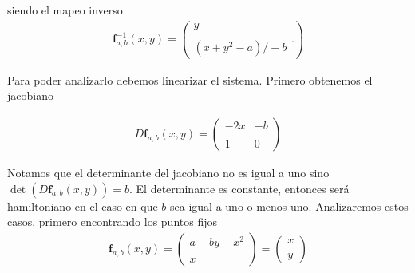 siendo el mapeo inverso
\begin{eqnarray}
\mathbf{f}^{-1}_{a,b}(x,y)=\left( \begin{array}{lcc}
             y\\
             \\ (x+y^{2}-a)/-b
             \end{array}.
             \right) \label{HenonI}
\end{eqnarray} 

       
Para poder analizarlo debemos linearizar el sistema. Primero obtenemos el jacobiano 
            
\begin{eqnarray}
D\mathbf{f}_{a,b}(x,y)= \left( \begin{array}{lcc}
                -2x & -b\\
                \\ 1 & 0
                \end{array}
                \right)
\end{eqnarray}

                
Notamos que el determinante del jacobiano no es igual a uno sino $\det(D\mathbf{f}_{a,b}(x,y))=b$.
El determinante es constante, entonces será hamiltoniano en el caso en que $b$ sea igual a uno o menos uno. Analizaremos estos casos, primero encontrando los puntos fijos
\begin{eqnarray}
\mathbf{f}_{a,b}(x,y)=\left( \begin{array}{lcc}
               a-by-x^{2}\\
               \\ x
               \end{array}
               \right) = \left(\begin{array}{lc}
               x \\
               \\ y
               \end{array}
               \right)
\end{eqnarray}
              
